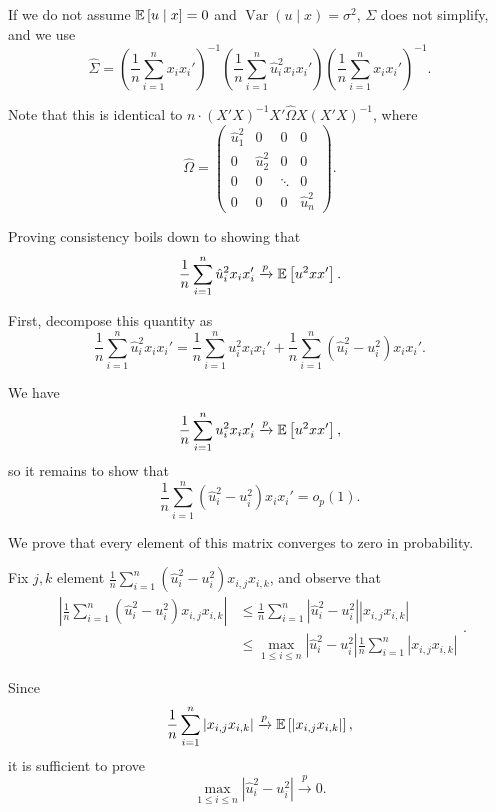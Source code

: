 \begin{remark}
	If we do not assume $\mathbb{E}\left[u \mid x\right] = 0$ and $\operatorname{Var}(u \mid x) = \sigma^2$, $\Sigma$ does not simplify, and we use \[
		\hat{\Sigma} = \left( \frac{1}{n} \sum_{i=1}^{n} x_i x_i' \right)^{-1} \left( \frac{1}{n} \sum_{i=1}^{n} \hat{u}_i^2 x_i x_i' \right) \left( \frac{1}{n} \sum_{i=1}^{n} x_i x_i' \right)^{-1}
	.\] 
	
	Note that this is identical to $n \cdot (X'X)^{-1} X' \hat{\Omega} X (X'X)^{-1}$, where \[
		\hat{\Omega} = 
		\begin{pmatrix}
			\hat{u}_1^2 & 0 & 0 & 0 \\
			0 & \hat{u}_2^2 & 0 & 0 \\
			0 & 0 & \ddots & 0 \\
			0 & 0 & 0 & \hat{u}_n^2
		\end{pmatrix}
	.\] 

	Proving consistency boils down to showing that \[
		\frac{1}{n} \sum_{i=1}^{n} \hat{u}_i^2 x_i x_i' \xrightarrow{p} \mathbb{E}\left[u^2 xx'\right] 
	.\] 
	
	First, decompose this quantity as \[
		\frac{1}{n} \sum_{i=1}^{n} \hat{u}_i^2 x_i x_i' = \frac{1}{n} \sum_{i=1}^{n} u_i^2 x_i x_i' + \frac{1}{n} \sum_{i=1}^{n} (\hat{u}_i^2 - u_i^2) x_i x_i'
	.\] 

	We have \[
		\frac{1}{n} \sum_{i=1}^{n} u_i^2 x_i x_i' \xrightarrow{p} \mathbb{E}\left[u^2 xx'\right] 
	,\] so it remains to show that \[
		\frac{1}{n} \sum_{i=1}^{n} (\hat{u}_i^2 - u_i^2) x_i x_i' = o_p(1)
	.\] 
	
	We prove that every element of this matrix converges to zero in probability.

	Fix $j,k$ element $\frac{1}{n} \sum_{i=1}^{n} (\hat{u}_i^2 - u_i^2) x_{i,j} x_{i,k}$, and observe that \[
		\begin{aligned}
			\left| \frac{1}{n} \sum_{i=1}^{n} (\hat{u}_i^2 - u_i^2) x_{i,j} x_{i,k} \right|
			&\le \frac{1}{n} \sum_{i=1}^{n} |\hat{u}_i^2 - u_i^2| |x_{i,j} x_{i,k}| \\
			&\le \max_{1 \le i \le n} |\hat{u}_i^2 - u_i^2| \frac{1}{n} \sum_{i=1}^{n} |x_{i,j} x_{i,k}|
		\end{aligned}
	.\] 
	
	Since \[
		\frac{1}{n} \sum_{i=1}^{n} |x_{i,j} x_{i,k}| \xrightarrow{p} \mathbb{E}\left[|x_{i,j} x_{i,k}|\right] 
	,\] it is sufficient to prove \[
		\max_{1 \le i \le n} |\hat{u}_i^2 - u_i^2| \xrightarrow{p} 0
	.\] 


\end{remark}
